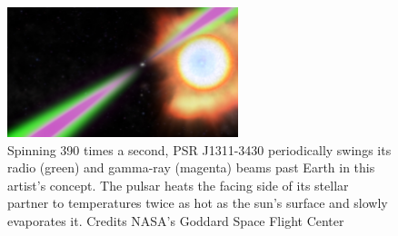 \begin{figure}[h]
\centering
\includegraphics[height=0.4\textwidth, width=0.6\textwidth]{images/BWP.jpg}
\caption{\small Spinning 390 times a second, PSR J1311-3430 periodically swings its radio (green) and gamma-ray (magenta) beams past Earth in this artist's concept. The pulsar heats the facing side of its stellar partner to temperatures twice as hot as the sun's surface and slowly evaporates it. Credits NASA's Goddard Space Flight Center}
\end{figure}
